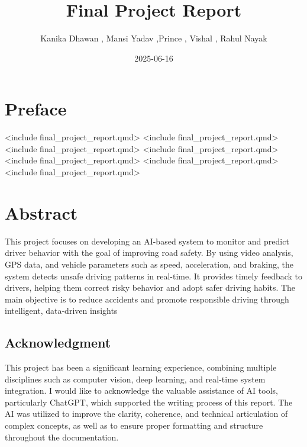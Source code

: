 \documentclass[
  letterpaper,
  DIV=11,
  numbers=noendperiod]{scrreport}
\title{Final Project Report}
\author{Kanika Dhawan , Mansi Yadav ,Prince , Vishal , Rahul Nayak}
\date{2025-06-16}
\renewcommand*\contentsname{Table of contents}
\newcommand\contentsname{Table of contents}
\begin{document}
\maketitle

\renewcommand*\contentsname{Table of contents}
{
\hypersetup{linkcolor=}
\setcounter{tocdepth}{2}
\tableofcontents
}
\listoffigures
\listoftables


\chapter*{Preface}\label{preface}


{{<include final_project_report\abstract.qmd>}}
{{<include final_project_report\conclusion.qmd>}}
{{<include final_project_report\eda.qmd>}}
{{<include final_project_report\intro.qmd>}}
{{<include final_project_report\methadology.qmd>}}
{{<include final_project_report\results.qmd>}}
{{<include final_project_report.qmd>}}


\chapter*{Abstract}\label{abstract}


This project focuses on developing an AI-based system to monitor and
predict driver behavior with the goal of improving road safety. By using
video analysis, GPS data, and vehicle parameters such as speed,
acceleration, and braking, the system detects unsafe driving patterns in
real-time. It provides timely feedback to drivers, helping them correct
risky behavior and adopt safer driving habits. The main objective is to
reduce accidents and promote responsible driving through intelligent,
data-driven insights

\section*{Acknowledgment}\label{acknowledgment}


This project has been a significant learning experience, combining
multiple disciplines such as computer vision, deep learning, and
real-time system integration. I would like to acknowledge the valuable
assistance of AI tools, particularly ChatGPT, which supported the
writing process of this report. The AI was utilized to improve the
clarity, coherence, and technical articulation of complex concepts, as
well as to ensure proper formatting and structure throughout the
documentation.
\end{document}

